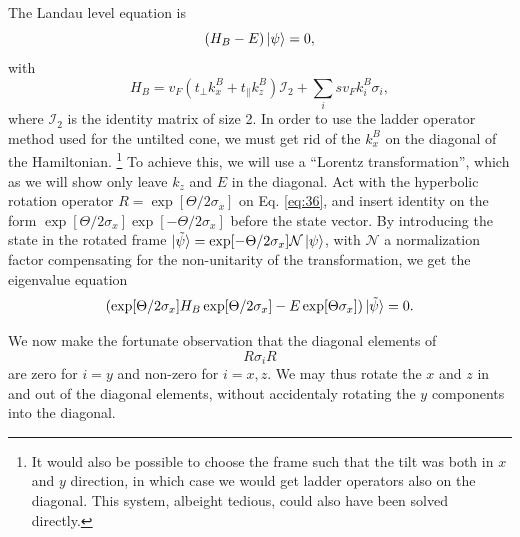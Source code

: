 The Landau level equation is
\begin{equation}
  \label{eq:36}
  \left(H_{B} - E\right) \ket{\psi } = 0,
\end{equation}
with
\begin{equation}
  \label{eq:37}
  H_{B} = v_F \left(t _{\perp} k^B_{x} + t _{\parallel} k^B_{z} \right) \mathcal{I}_2 + \sum_i s v_{F} k^B_{i} \sigma _{i},
\end{equation}
where \(\mathcal{I}_{2}\) is the identity matrix of size 2.
In order to use the ladder operator method used for the untilted cone, we must get rid of the \(k^B_{x}\) on the diagonal of the Hamiltonian.
\footnote{It would also be possible to choose the frame such that the tilt was both in \(x\) and \(y\) direction, in which case we would get ladder operators also on the diagonal.
  This system, albeight tedious, could also have been solved directly.
}
To achieve this, we will use a ``Lorentz transformation'', which as we will show only leave \(k_{z}\) and \(E\) in the diagonal.
Act with the hyperbolic rotation operator \(R = \exp[\Theta /2 \sigma_{x}]\) on Eq. \eqref{eq:36}, and insert identity on the form \(\exp[\Theta /2 \sigma_{x}]\exp[-\Theta /2 \sigma_{x}]\) before the state vector.
By introducing the state in the rotated frame \(\ket{\tilde{\psi}} = \exp[- \Theta /2 \sigma_{x}] \mathcal{N} \ket{\psi } \), with \(\mathcal{N}\) a normalization factor compensating for the non-unitarity of the transformation, we get the eigenvalue equation
\begin{equation}
  \label{eq:38}
  (\exp[\Theta /2 \sigma_{x}] H_{B}\exp[\Theta /2 \sigma_{x}] - E \exp[\Theta \sigma_{x}]) \ket{\tilde{\psi}} = 0.
\end{equation}

We now make the fortunate observation that the diagonal elements of
\[
  R \sigma_{i} R
\]
are zero for $i=y$ and non-zero for \(i=x,z\).
We may thus rotate the \(x\) and \(z\) in and out of the diagonal elements, without accidentaly rotating the \(y\) components into the diagonal.

